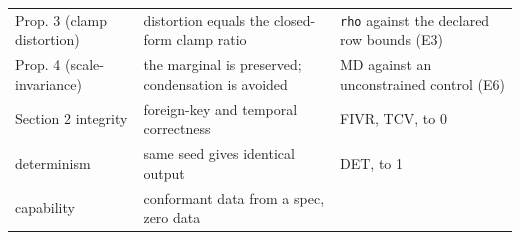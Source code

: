 \begin{longtable}[]{@{}lll@{}}
\begin{minipage}[t]{0.30\columnwidth}\raggedright
Prop. 3 (clamp distortion)\strut
\end{minipage} & \begin{minipage}[t]{0.30\columnwidth}\raggedright
distortion equals the closed-form clamp ratio\strut
\end{minipage} & \begin{minipage}[t]{0.30\columnwidth}\raggedright
\texttt{rho} against the declared row bounds (E3)\strut
\end{minipage}\tabularnewline
\begin{minipage}[t]{0.30\columnwidth}\raggedright
Prop. 4 (scale-invariance)\strut
\end{minipage} & \begin{minipage}[t]{0.30\columnwidth}\raggedright
the marginal is preserved; condensation is avoided\strut
\end{minipage} & \begin{minipage}[t]{0.30\columnwidth}\raggedright
MD against an unconstrained control (E6)\strut
\end{minipage}\tabularnewline
\begin{minipage}[t]{0.30\columnwidth}\raggedright
Section 2 integrity\strut
\end{minipage} & \begin{minipage}[t]{0.30\columnwidth}\raggedright
foreign-key and temporal correctness\strut
\end{minipage} & \begin{minipage}[t]{0.30\columnwidth}\raggedright
FIVR, TCV, to 0\strut
\end{minipage}\tabularnewline
\begin{minipage}[t]{0.30\columnwidth}\raggedright
determinism\strut
\end{minipage} & \begin{minipage}[t]{0.30\columnwidth}\raggedright
same seed gives identical output\strut
\end{minipage} & \begin{minipage}[t]{0.30\columnwidth}\raggedright
DET, to 1\strut
\end{minipage}\tabularnewline
\begin{minipage}[t]{0.30\columnwidth}\raggedright
capability\strut
\end{minipage} & \begin{minipage}[t]{0.30\columnwidth}\raggedright
conformant data from a spec, zero data\strut
\end{minipage} & \begin{minipage}[t]{0.30\columnwidth}\raggedright

\end{minipage}
\end{longtable}
